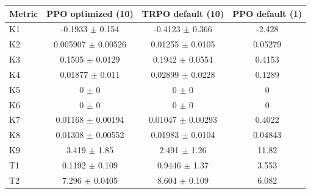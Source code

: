 \begin{tabular}{lccc}
\toprule
Metric & PPO optimized (10) & TRPO default (10) & PPO default (1) \\
\midrule
K1 & -0.1933 $\pm$ 0.154 & -0.4123 $\pm$ 0.366 & -2.428 \\
K2 & 0.005907 $\pm$ 0.00526 & 0.01255 $\pm$ 0.0105 & 0.05279 \\
K3 & 0.1505 $\pm$ 0.0129 & 0.1942 $\pm$ 0.0554 & 0.4153 \\
K4 & 0.01877 $\pm$ 0.011 & 0.02899 $\pm$ 0.0228 & 0.1289 \\
K5 & 0 $\pm$ 0 & 0 $\pm$ 0 & 0 \\
K6 & 0 $\pm$ 0 & 0 $\pm$ 0 & 0 \\
K7 & 0.01168 $\pm$ 0.00194 & 0.01047 $\pm$ 0.00293 & 0.4022 \\
K8 & 0.01308 $\pm$ 0.00552 & 0.01983 $\pm$ 0.0104 & 0.04843 \\
K9 & 3.419 $\pm$ 1.85 & 2.491 $\pm$ 1.26 & 11.82 \\
T1 & 0.1192 $\pm$ 0.109 & 0.9446 $\pm$ 1.37 & 3.553 \\
T2 & 7.296 $\pm$ 0.0405 & 8.604 $\pm$ 0.109 & 6.082 \\
\bottomrule
\end{tabular}

